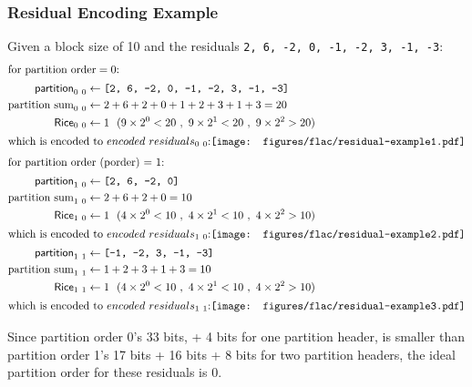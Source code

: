 \clearpage

\subsubsection{Residual Encoding Example}
Given a block size of 10 and the residuals \texttt{2, 6, -2, 0, -1, -2, 3, -1, -3}:
\begin{align*}
\intertext{for $\text{partition order} = 0$:}
\textsf{partition}_{0~0} &\leftarrow \texttt{[2, 6, -2, 0, -1, -2, 3, -1, -3]} \\
\text{partition sum}_{0~0} &\leftarrow 2 + 6 + 2 + 0 + 1 + 2 + 3 + 1 + 3 = 20 \\
\textsf{Rice}_{0~0} &\leftarrow 1~~(9 \times 2 ^ 0 < 20~,~9 \times 2 ^ 1 < 20~,~9 \times 2 ^ 2 > 20) \\
\intertext{which is encoded to $encoded~residuals_{0~0}$:
\newline
\texttt{[image: figures/flac/residual-example1.pdf]}}
\intertext{for partition order (porder) = 1:}
\textsf{partition}_{1~0} &\leftarrow \texttt{[2, 6, -2, 0]} \\
\text{partition sum}_{1~0} &\leftarrow 2 + 6 + 2 + 0 = 10 \\
\textsf{Rice}_{1~0} &\leftarrow 1~~(4 \times 2 ^ 0 < 10~,~4 \times 2 ^ 1 < 10~,~4 \times 2 ^ 2 > 10) \\
\intertext{which is encoded to $encoded~residuals_{1~0}$:
\newline
\texttt{[image: figures/flac/residual-example2.pdf]}}
\textsf{partition}_{1~1} &\leftarrow \texttt{[-1, -2, 3, -1, -3]} \\
\text{partition sum}_{1~1} &\leftarrow 1 + 2 + 3 + 1 + 3 = 10 \\
\textsf{Rice}_{1~1} &\leftarrow 1~~(4 \times 2 ^ 0 < 10~,~4 \times 2 ^ 1 < 10~,~4 \times 2 ^ 2 > 10) \\
\intertext{which is encoded to $encoded~residuals_{1~1}$:
\newline
\texttt{[image: figures/flac/residual-example3.pdf]}}
\end{align*}
\par
\noindent
Since partition order 0's 33 bits, + 4 bits for one partition header,
is smaller than partition order 1's 17 bits + 16 bits + 8 bits
for two partition headers, the ideal partition order for these residuals is 0.

\clearpage

